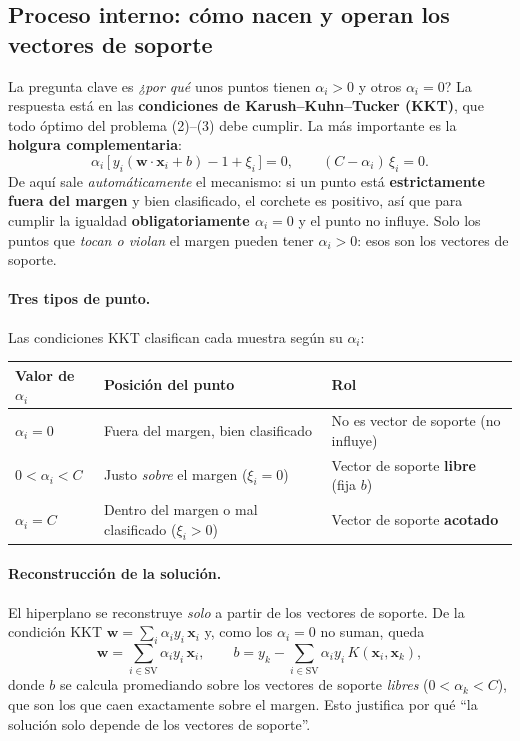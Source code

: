 \documentclass[11pt,a4paper]{article}
\newcommand{\say}[1]{\enquote{#1}}
\begin{document}
\subsection{Proceso interno: cómo nacen y operan los vectores de soporte}
La pregunta clave es \emph{¿por qué} unos puntos tienen $\alpha_i>0$ y otros $\alpha_i=0$?
La respuesta está en las \textbf{condiciones de Karush--Kuhn--Tucker (KKT)}, que todo óptimo del
problema (2)--(3) debe cumplir. La más importante es la \textbf{holgura complementaria}:
\begin{equation}
\alpha_i\,\bigl[\,y_i(\mathbf{w}\cdot\mathbf{x}_i+b) - 1 + \xi_i\,\bigr]=0,
\qquad
(C-\alpha_i)\,\xi_i = 0.
\end{equation}
De aquí sale \emph{automáticamente} el mecanismo: si un punto está \textbf{estrictamente fuera del
margen} y bien clasificado, el corchete es positivo, así que para cumplir la igualdad
\textbf{obligatoriamente $\alpha_i=0$} y el punto no influye. Solo los puntos que \emph{tocan o
violan} el margen pueden tener $\alpha_i>0$: esos son los vectores de soporte.

\paragraph{Tres tipos de punto.} Las condiciones KKT clasifican cada muestra según su $\alpha_i$:
\begin{center}
\renewcommand{\arraystretch}{1.25}
\begin{tabular}{@{}lll@{}}
\toprule
\textbf{Valor de $\alpha_i$} & \textbf{Posición del punto} & \textbf{Rol} \\
\midrule
$\alpha_i = 0$        & Fuera del margen, bien clasificado & No es vector de soporte (no influye) \\
$0 < \alpha_i < C$    & Justo \emph{sobre} el margen ($\xi_i=0$) & Vector de soporte \textbf{libre} (fija $b$) \\
$\alpha_i = C$        & Dentro del margen o mal clasificado ($\xi_i>0$) & Vector de soporte \textbf{acotado} \\
\bottomrule
\end{tabular}
\end{center}

\paragraph{Reconstrucción de la solución.} El hiperplano se reconstruye \emph{solo} a partir de los
vectores de soporte. De la condición KKT $\mathbf{w}=\sum_i\alpha_i y_i\,\mathbf{x}_i$ y, como los
$\alpha_i=0$ no suman, queda
\begin{equation}
\mathbf{w}=\!\!\sum_{i\in\text{SV}}\!\!\alpha_i y_i\,\mathbf{x}_i,
\qquad
b = y_k - \!\!\sum_{i\in\text{SV}}\!\!\alpha_i y_i\,K(\mathbf{x}_i,\mathbf{x}_k),
\end{equation}
donde $b$ se calcula promediando sobre los vectores de soporte \emph{libres} ($0<\alpha_k<C$), que
son los que caen exactamente sobre el margen. Esto justifica por qué \say{la solución solo depende
de los vectores de soporte}.
\end{document}
